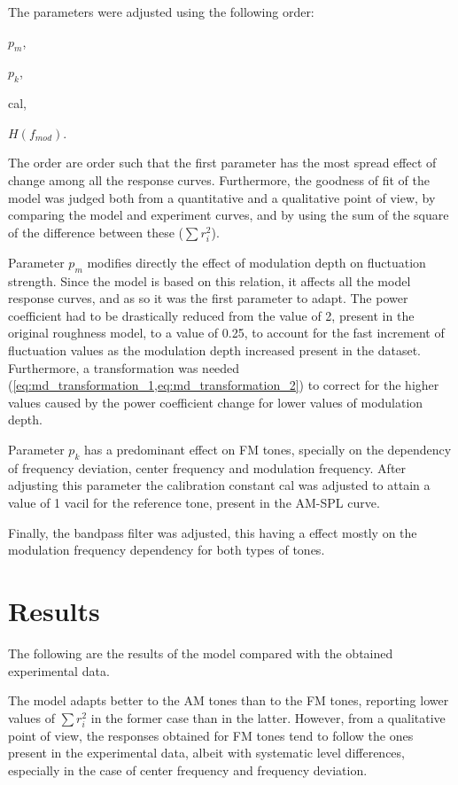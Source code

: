 \documentclass[../main.tex]{subfiles}
\begin{document}
\begin{modelchapter}
The parameters were adjusted using the following order:
\begin{inparaenum}[(1)]
  \item $p_m$,
  \item $p_k$,
  \item cal,
  \item $H(f_{mod})$.
\end{inparaenum}
The order are order such that the first parameter has the most spread effect
of change among all the response curves. Furthermore, the goodness of fit of the
model was judged both from a quantitative and a qualitative point of view, by
comparing the model and experiment curves, and by using the sum of the square of
the difference between these ($\sum r_i^2$).

Parameter $p_m$ modifies directly the effect of modulation depth on fluctuation
strength. Since the model is based on this relation, it affects all the model
response curves, and as so it was the first parameter to adapt. The power
coefficient had to be drastically reduced from the value of 2, present in the
original roughness model, to a value of 0.25, to account for the fast increment
of fluctuation values as the modulation depth increased present in the dataset.
Furthermore, a transformation was needed
(\cref{eq:md_transformation_1,eq:md_transformation_2}) to correct for the higher
values caused by the power coefficient change for lower values of
modulation depth.

Parameter $p_k$ has a predominant effect on \gls{FM} tones, specially on the
dependency of frequency deviation, center frequency and modulation frequency.
After adjusting this parameter the calibration constant cal was adjusted to
attain a value of 1 vacil for the reference tone, present in the AM-SPL curve.

Finally, the bandpass filter was adjusted, this having a effect mostly on the
modulation frequency dependency for both types of tones.

\section{Results}

The following are the results of the model compared with the obtained
experimental data.


The model adapts better to the AM tones than to the FM tones, reporting lower
values of $\sum r_i^2$ in the former case than in the latter. However, from a
qualitative point of view, the responses obtained for FM tones tend to follow
the ones present in the experimental data, albeit with systematic level
differences, especially in the case of center frequency and frequency deviation.

\end{modelchapter}
\end{document}
